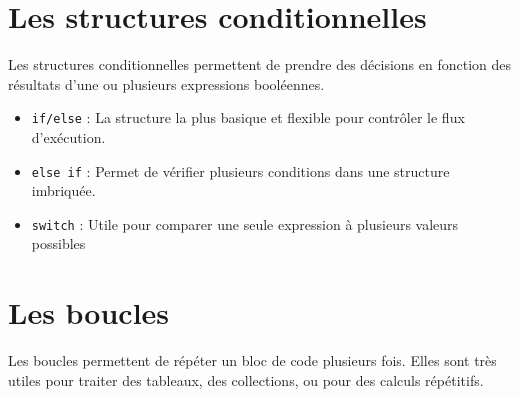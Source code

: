 \section{Les structures conditionnelles}

Les structures conditionnelles permettent de prendre des décisions en fonction des résultats d'une ou plusieurs expressions booléennes.

\begin{itemize}
	\item \lstinline[]|if/else| : La structure la plus basique et flexible pour contrôler le flux d’exécution.
	
	
	\item \lstinline|else if| : Permet de vérifier plusieurs conditions dans une structure imbriquée.
	
	
	
	\item \lstinline|switch| : Utile pour comparer une seule expression à plusieurs valeurs possibles
	
	
	
\end{itemize}

\section{Les boucles}

Les boucles permettent de répéter un bloc de code plusieurs fois. Elles sont très utiles pour traiter des tableaux, des collections, ou pour des calculs répétitifs.

